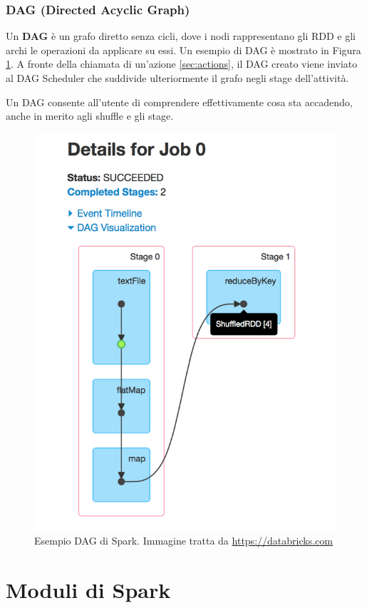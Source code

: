 \documentclass[12pt,italian]{article}
\begin{document}
\subsubsection{DAG (Directed Acyclic Graph) }\label{sec:DAG}
Un \textbf{DAG} è un grafo diretto senza cicli, dove i nodi rappresentano gli RDD e gli archi le operazioni da applicare su essi. Un esempio di DAG è mostrato in Figura \ref{fig:DAG}.
A fronte della chiamata di un'azione \ref{sec:actions}, il DAG creato viene inviato al DAG Scheduler che suddivide ulteriormente il grafo negli stage dell'attività.
\par Un DAG consente all'utente di comprendere effettivamente cosa sta accadendo, anche in merito agli shuffle e gli stage.
\begin{figure}
	\centering 
	\includegraphics[width=0.6\linewidth]{img/DAG.png}
	\caption{Esempio DAG di Spark. Immagine tratta da \url{https://databricks.com}}
	\label{fig:DAG}
\end{figure}
\section{Moduli di Spark}
\end{document}
